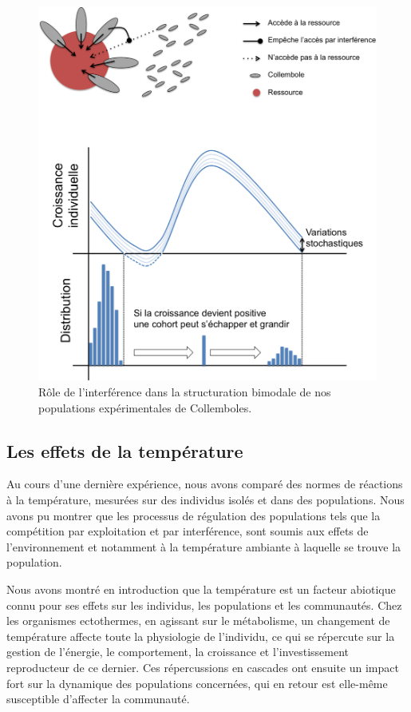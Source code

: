 \begin{figure}[!ht]
\begin{center}
\includegraphics[width=1\textwidth]{Conclu/Interf0}
\caption[Rôle de l'interférence dans la
structuration bimodale]{Rôle de l'interférence dans la
structuration bimodale de nos populations expérimentales de Collemboles.}
\label{fig:Concl0}
\end{center}
\end{figure}


\subsection{Les effets de la température}

Au cours d'une dernière expérience, nous avons comparé des normes de réactions à
la température, mesurées sur des individus isolés et dans des populations. Nous
avons pu montrer que les processus de régulation des populations tels que la
compétition par exploitation et par interférence, sont soumis aux effets de
l'environnement et notamment à la température ambiante à laquelle se trouve la
population.

Nous avons montré en introduction que la température est un facteur abiotique
connu pour ses effets sur les individus, les populations et les communautés.
Chez les organismes ectothermes, en agissant sur le métabolisme, un changement
de température affecte toute la physiologie de l'individu, ce qui se répercute
sur la gestion de l'énergie, le comportement, la croissance et l'investissement
reproducteur de ce dernier. Ces répercussions en cascades ont ensuite un impact
fort sur la dynamique des populations concernées, qui en retour est elle-même
susceptible d'affecter la communauté.

